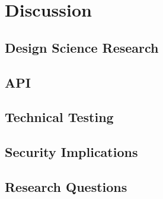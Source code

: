 \documentclass[../Main/thesis.tex]{subfiles}
\begin{document}
\chapter{Discussion}%
\label{ch:discussion}

\section{Design Science Research}%
\label{sec:design_science_research_evaluation}

\section{API}%
\label{sec:api}

\section{Technical Testing}%
\label{sec:technical_testing}

\section{Security Implications}%
\label{sec:security_implications}

\section{Research Questions}%
\label{sec:research_questions}


\blankpage
\end{document}
